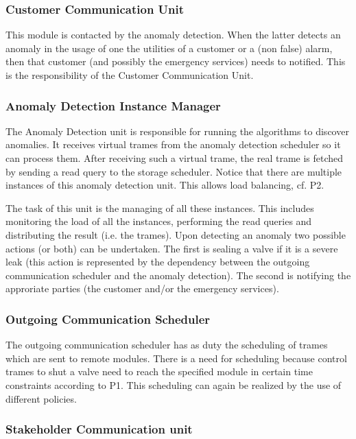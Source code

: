 \subsubsection{Customer Communication Unit}

\npar This module is contacted by the anomaly detection. When the latter detects
an anomaly in the usage of one the utilities of a customer or a (non false)
alarm, then that customer (and possibly the emergency services) needs to
notified. This is the responsibility of the Customer Communication Unit.

\subsubsection{Anomaly Detection Instance Manager}

\npar The Anomaly Detection unit is responsible for running the algorithms to
discover anomalies. It receives virtual trames from the anomaly detection
scheduler so it can process them. After receiving such a virtual trame, the
real trame is fetched by sending a read query to the storage scheduler. Notice
that there are multiple instances of this anomaly detection unit. This allows
load balancing, cf. P2. 

\npar The task of this unit is the managing of all these instances. This
includes monitoring the load of all the instances, performing the read queries
and distributing the result (i.e. the trames). Upon detecting an anomaly two
possible actions (or both) can be undertaken. The first is sealing a valve if
it is a severe leak (this action is represented by the dependency between the
outgoing communication scheduler and the anomaly detection). The second is
notifying the approriate parties (the customer and/or the emergency services).

\subsubsection{Outgoing Communication Scheduler}

\npar The outgoing communication scheduler has as duty the scheduling of
trames which are sent to remote modules. There is a need for scheduling because
control trames to shut a valve need to reach the specified module in certain
time constraints according to P1. This scheduling can again be realized by the
use of different policies.

\subsubsection{Stakeholder Communication unit}


